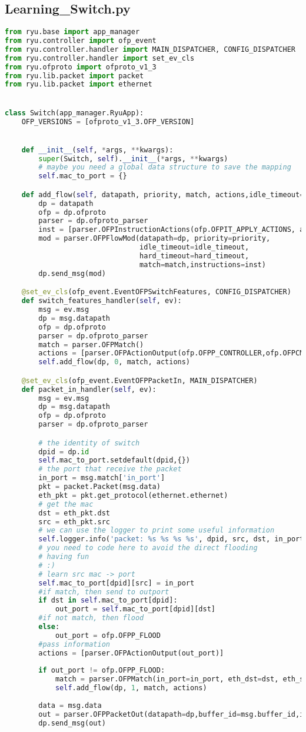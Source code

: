 \documentclass{xjtureport}
\begin{document}
\subsection{Learning\_Switch.py}
\begin{lstlisting}[language=Python]
from ryu.base import app_manager 
from ryu.controller import ofp_event 
from ryu.controller.handler import MAIN_DISPATCHER, CONFIG_DISPATCHER 
from ryu.controller.handler import set_ev_cls 
from ryu.ofproto import ofproto_v1_3 
from ryu.lib.packet import packet 
from ryu.lib.packet import ethernet 


class Switch(app_manager.RyuApp): 
	OFP_VERSIONS = [ofproto_v1_3.OFP_VERSION] 


	def __init__(self, *args, **kwargs): 
		super(Switch, self).__init__(*args, **kwargs)
		# maybe you need a global data structure to save the mapping 
		self.mac_to_port = {}

	def add_flow(self, datapath, priority, match, actions,idle_timeout=0,hard_timeout=0):
		dp = datapath 
		ofp = dp.ofproto 
		parser = dp.ofproto_parser 
		inst = [parser.OFPInstructionActions(ofp.OFPIT_APPLY_ACTIONS, actions)] 
		mod = parser.OFPFlowMod(datapath=dp, priority=priority, 
								idle_timeout=idle_timeout,
								hard_timeout=hard_timeout,
								match=match,instructions=inst) 
		dp.send_msg(mod) 

	@set_ev_cls(ofp_event.EventOFPSwitchFeatures, CONFIG_DISPATCHER) 
	def switch_features_handler(self, ev): 
		msg = ev.msg 
		dp = msg.datapath 
		ofp = dp.ofproto 
		parser = dp.ofproto_parser
		match = parser.OFPMatch() 
		actions = [parser.OFPActionOutput(ofp.OFPP_CONTROLLER,ofp.OFPCML_NO_BUFFER)] 
		self.add_flow(dp, 0, match, actions)

	@set_ev_cls(ofp_event.EventOFPPacketIn, MAIN_DISPATCHER) 
	def packet_in_handler(self, ev): 
		msg = ev.msg 
		dp = msg.datapath 
		ofp = dp.ofproto 
		parser = dp.ofproto_parser 

		# the identity of switch 
		dpid = dp.id 
		self.mac_to_port.setdefault(dpid,{}) 
		# the port that receive the packet 
		in_port = msg.match['in_port']
		pkt = packet.Packet(msg.data) 
		eth_pkt = pkt.get_protocol(ethernet.ethernet) 
		# get the mac 
		dst = eth_pkt.dst 
		src = eth_pkt.src 
		# we can use the logger to print some useful information 
		self.logger.info('packet: %s %s %s %s', dpid, src, dst, in_port)
		# you need to code here to avoid the direct flooding 
		# having fun 
		# :)
		# learn src mac -> port
		self.mac_to_port[dpid][src] = in_port
		#if match, then send to outport
		if dst in self.mac_to_port[dpid]:
			out_port = self.mac_to_port[dpid][dst]
		#if not match, then flood
		else:
			out_port = ofp.OFPP_FLOOD
		#pass information
		actions = [parser.OFPActionOutput(out_port)]
		
		if out_port != ofp.OFPP_FLOOD:
			match = parser.OFPMatch(in_port=in_port, eth_dst=dst, eth_src=src)
			self.add_flow(dp, 1, match, actions)
			
		data = msg.data
		out = parser.OFPPacketOut(datapath=dp,buffer_id=msg.buffer_id,in_port=in_port, actions=actions, data=data)
		dp.send_msg(out)
\end{lstlisting}
\end{document}
